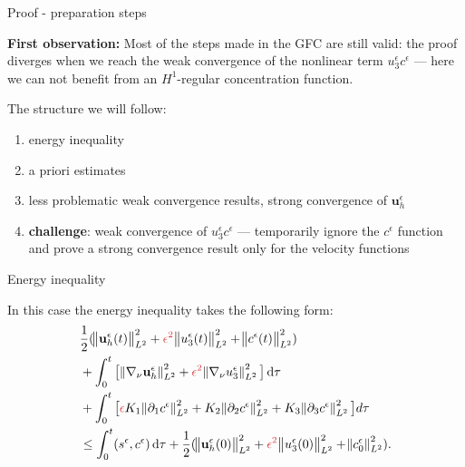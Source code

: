 \documentclass{beamer}
\newcommand*\diff{\mathop{}\!\mathrm{d}}
\begin{document}
\begin{frame}{Proof - preparation steps}

\textbf{First observation:} Most of the steps made in the GFC are still valid: the proof diverges when we reach the weak convergence of the nonlinear term $u_3^\epsilon c^\epsilon$ --- here we can not benefit from an $H^1$-regular concentration function.

The structure we will follow:

\begin{enumerate}
\item energy inequality \checkmark
\item a priori estimates \checkmark
\item less problematic weak convergence results, strong convergence of $\mathbf{u}_h^\epsilon$ \checkmark
\item \textbf{challenge}: weak convergence of $u_3^\epsilon c^\epsilon$ --- temporarily ignore the $c^\epsilon$ function and prove a strong convergence result only for the velocity functions
\end{enumerate}

\end{frame}

\begin{frame}{Energy inequality}

In this case the energy inequality takes the following form:
  \begin{equation} \nonumber
    \begin{split}  
    & \frac{1}{2} (\norm{\mathbf{u}_h^\epsilon (t)}_{L^2}^2 + \textcolor{jasper}{\epsilon^2} \norm{u_3^\epsilon (t)}_{L^2}^2 + \norm{c^\epsilon (t)}_{L^2}^2) \\
    & + \int_0 ^ t \big[ \norm{\nabla_\nu \mathbf{u}_h^\epsilon}_{L^2}^2 + \textcolor{jasper}{\epsilon^2} \norm{\nabla_\nu u_3^\epsilon}_{L^2}^2  \big] \diff \tau \\
    & + \int_0 ^ t  \big [ \textcolor{jasper}{\epsilon} K_1 \norm{\partial_1 c^\epsilon}_{L^2}^2  + K_2 \norm{\partial_2 c^\epsilon}_{L^2}^2 + K_3 \norm{\partial_3 c^\epsilon}_{L^2}^2 \big ] d \tau \\
    & \leq \int_0^t (s^\epsilon,c^\epsilon) \diff \tau + \frac{1}{2} (\norm{\mathbf{u}_h^\epsilon (0)}_{L^2}^2 + \textcolor{jasper}{\epsilon^2} \norm{u_3^\epsilon (0)}_{L^2}^2 + \norm{c^\epsilon_0}_{L^2}^2).
    \end{split}
  \end{equation}
\end{frame}
\end{document}
